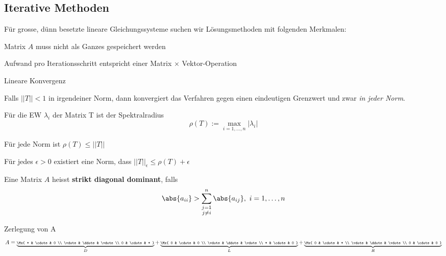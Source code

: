 	\subsection{Iterative Methoden}
		Für grosse, dünn besetzte lineare Gleichungssysteme suchen wir Lösungsmethoden mit folgenden Merkmalen:
		\begin{tightitemize}
			\item Matrix $A$ muss nicht als Ganzes gespeichert werden
			\item Aufwand pro Iterationsschritt entspricht einer Matrix $\times$ Vektor-Operation
			\item Lineare Konvergenz
		\end{tightitemize}

		Falls $||T|| < 1$ in irgendeiner Norm, dann konvergiert das Verfahren gegen
		einen eindeutigen Grenzwert und zwar \emph{in jeder Norm}.

		\begin{definition}
			Für die EW $\lambda_i$ der Matrix T ist der Spektralradius
			\[
				\rho(T) := \underset{i = 1, \dots , n}\max{|\lambda_i|}
			\]

			\begin{tightenumerate}
				\item Für jede Norm ist $\rho(T) \leq ||T||$
				\item Für jedes $\epsilon > 0$ existiert eine Norm, dass $||T||_\epsilon \leq \rho(T) + \epsilon$
			\end{tightenumerate}
		\end{definition}

		\begin{definition}
			Eine Matrix $A$ heisst \textbf{strikt diagonal dominant}, falls
			\[
				\abs{a_{ii}} > \sum_{\substack{
					j=1 \\ j \neq i
				}}^n \abs{a_{ij}}, \ i = 1,\dots,n
			\]
		\end{definition}

		\begin{notation}
			Zerlegung von A
			\[
				A = \scriptsize\underbrace{
					\Mx{
						* & \cdots & 0 \\
						\vdots & \ddots & \vdots \\
						0 & \cdots & *
					}
				}_{D} + \underbrace{
					\Mx{
						0 & \cdots & 0 \\
						\vdots & \ddots & \vdots \\
						* & \cdots & 0
					}
				}_{L} + \underbrace{
					\Mx{
						0 & \cdots & * \\
						\vdots & \ddots & \vdots \\
						0 & \cdots & 0
					}
				}_{R}
			\]
		\end{notation}


